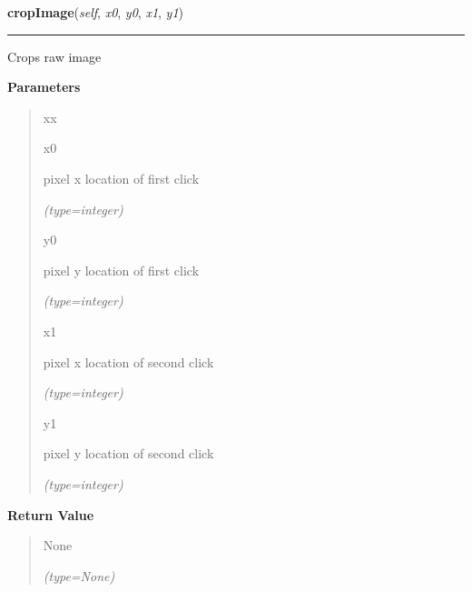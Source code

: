     \label{client_gui:GuiClass:cropImage}

    \vspace{0.5ex}

\hspace{.8\funcindent}\begin{boxedminipage}{\funcwidth}

    \raggedright \textbf{cropImage}(\textit{self}, \textit{x0}, \textit{y0}, \textit{x1}, \textit{y1})

    \vspace{-1.5ex}

    \rule{\textwidth}{0.5\fboxrule}
\setlength{\parskip}{2ex}
    Crops raw image

\setlength{\parskip}{1ex}
      \textbf{Parameters}
      \vspace{-1ex}

      \begin{quote}
        \begin{Ventry}{xx}

          \item[x0]

          pixel x location of first click

            {\it (type=integer)}

          \item[y0]

          pixel y location of first click

            {\it (type=integer)}

          \item[x1]

          pixel x location of second click

            {\it (type=integer)}

          \item[y1]

          pixel y location of second click

            {\it (type=integer)}

        \end{Ventry}

      \end{quote}

      \textbf{Return Value}
    \vspace{-1ex}

      \begin{quote}
      None

      {\it (type=None)}

      \end{quote}

    \end{boxedminipage}

